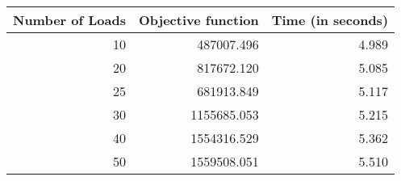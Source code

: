 \begin{tabular}{| r | r | r |}
  \hline 
  Number of Loads & Objective function & Time (in seconds) \\ 
  \hline \hline 
  10 & 487007.496 & 4.989 \\ \hline 
  20 & 817672.120 & 5.085 \\ \hline 
  25 & 681913.849 & 5.117 \\ \hline 
  30 & 1155685.053 & 5.215 \\ \hline 
  40 & 1554316.529 & 5.362 \\ \hline 
  50 & 1559508.051 & 5.510 \\ \hline 
\end{tabular}
